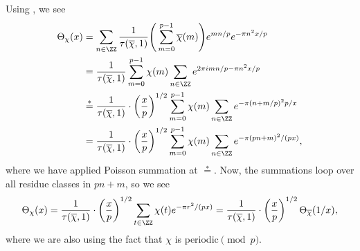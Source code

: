 \documentclass[../notes.tex]{subfiles}
\begin{document}
Using , we see
\begin{align*}
	\Theta_\chi(x) &= \sum_{n\in\ZZ}\frac1{\tau(\overline\chi,1)}\Bigg(\sum_{m=0}^{p-1}\overline\chi(m)\Bigg)e^{mn/p}e^{-\pi n^2x/p} \\
	&= \frac1{\tau(\overline\chi,1)}\sum_{m=0}^{p-1}\chi(m)\sum_{n\in\ZZ}e^{2\pi imn/p-\pi n^2x/p} \\
	&\stackrel*= \frac1{\tau(\overline\chi,1)}\cdot\left(\frac xp\right)^{1/2}\sum_{m=0}^{p-1}\chi(m)\sum_{n\in\ZZ}e^{-\pi(n+m/p)^2p/x} \\
	&= \frac1{\tau(\overline\chi,1)}\cdot\left(\frac xp\right)^{1/2}\sum_{m=0}^{p-1}\chi(m)\sum_{n\in\ZZ}e^{-\pi(pn+m)^2/(px)},
\end{align*}
where we have applied Poisson summation at $\stackrel*=$. Now, the summations loop over all residue classes in $pn+m$, so we see
\[\Theta_\chi(x)=\frac1{\tau(\overline\chi,1)}\cdot\left(\frac xp\right)^{1/2}\sum_{t\in\ZZ}\chi(t)e^{-\pi r^2/(px)}=\frac1{\tau(\overline\chi,1)}\cdot\left(\frac xp\right)^{1/2}\Theta_{\overline\chi}(1/x),\]
where we are also using the fact that $\chi$ is periodic$\pmod p$.
\end{document}
